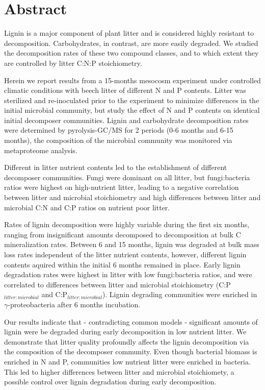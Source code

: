 \section*{Abstract}

Lignin is a major component of plant litter and is considered highly resistant to decomposition. Carbohydrates, in contrast, are more easily degraded. We studied the decomposition rates of these two compound classes, and to which extent they are controlled by litter C:N:P stoichiometry. 

Herein we report results from a 15-months mesocosm experiment under controlled climatic conditions with beech litter of different N and P contents. Litter was sterilized and re-inoculated prior to the experiment to minimize differences in the initial microbial community, but study the effect of N and P contents on identical initial decomposer communities. Lignin and carbohydrate decomposition rates were determined by pyrolysis-GC/MS for 2 periods (0-6 months and 6-15 months), the composition of the microbial community was monitored via metaproteome analysis.

Different in litter nutrient contents led to the establishment of different decomposer communities. Fungi were dominant on all litter, but fungi:bacteria ratios were highest on high-nutrient litter, leading to a negative correlation between litter and microbial stoichiometry and high differences between litter and microbial C:N and C:P ratios on nutrient poor litter.

Rates of lignin decomposition were highly variable during the first six months, ranging from insignificant amounts decomposed to decomposition at bulk C mineralization rates. Between 6 and 15 months, lignin was degraded at bulk mass loss rates independent of the litter nutrient contents, however, different lignin contents aquired within the initial 6 months remained in place. Early lignin degradation rates were highest in litter with low fungi:bacteria ratios, and were correlated to differences between litter and microbial stoichiometry (C:P$_{litter : microbial}$ and C:P$_{litter : microbial}$). Lignin degrading communities were enriched in $\gamma$-proteobacteria after 6 months incubation.

Our results indicate that - contradicting common models - significant amounts of lignin were be degraded during early decomposition in low nutrient litter. We demonstrate that litter quality profoundly affects the lignin decomposition via the composition of the decomposer community. Even though bacterial biomass is enriched in N and P, communities low nutrient litter were enriched in bacteria. This led to higher differences between litter and microbial stoichiomety, a possible control over lignin degradation during early decomposition. 